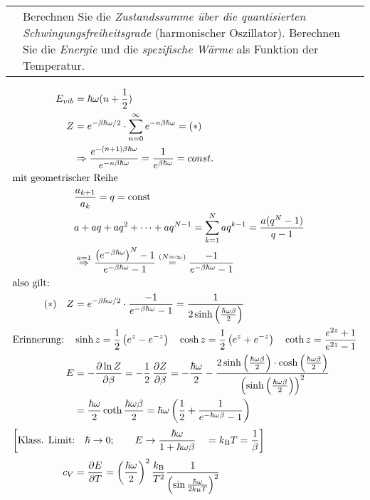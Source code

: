\documentclass[a4paper,12pt]{scrartcl}
\makeatletter
\def\dpf#1#2{\dfrac{\partial #1}{\partial #2}}		%
\def\ka#1{\left(#1\right)}				%
\def\const{\mathrm{const}}				%
\def\kB{k_\mathrm{B}}					%
\newcounter{qc}\setcounter{qc}{1}
\newenvironment{fshaded}{
\def\FrameCommand{\fcolorbox{framecolor}{shadecolor}}
\MakeFramed {\FrameRestore}}
{\endMakeFramed}
\def\frage#1{
\begin{fshaded}
\noindent
\begin{tabularx}{0.99\textwidth}{@{}c!{\color{framecolor}\vline}X}
{ \bf \rm \theqc }	&	\noindent #1
\end{tabularx}
\stepcounter{qc}
\end{fshaded}
}
\makeatother
\begin{document}


\frage{Berechnen Sie die \textit{Zustandssumme über die quantisierten Schwingungsfreiheitsgrade} (harmonischer Oszillator). 
Berechnen Sie die \textit{Energie} und die \textit{spezifische Wärme} als Funktion der
Temperatur.}
\noindent
\begin{align*}
E_{vib}&=\hbar\omega(n+\frac{1}{2})\\
Z&=e^{-\beta \hbar \omega/2} \cdot \sum_{n=0}^{\infty}e^{-n \beta \hbar \omega}=(*)\\
&\Rightarrow \dfrac{e^{-(n+1)\beta \hbar \omega}}{e^{-n \beta \hbar \omega}} = \dfrac{1}{e^{\beta \hbar \omega}}=const.\\
\intertext{mit geometrischer Reihe}
&\dfrac{a_{k+1}}{a_k}=q=\const\\&a+aq+aq^2+ \cdots + aq^{N-1}=\sum_{k=1}^{N} 
aq^{k-1}=\dfrac{a(q^N-1)}{q-1}\\
&\stackrel{a=1}{\Rightarrow} \dfrac{ \left( e^{-\beta \hbar \omega} \right )^N-1}{e^{-\beta \hbar \omega}-1} 
\stackrel{(N=\infty)}{=} \dfrac{-1}{e^{-\beta \hbar \omega}-1}\\ %
\intertext{also gilt:}
(*)\quad Z&=e^{-\beta \hbar \omega/2} \cdot \dfrac{-1}{e^{-\beta \hbar \omega}-1}=\dfrac{1}{2 \sinh \left( \frac{\hbar \omega 
\beta}{2} \right)}\\
\text{Erinnerung:}\quad&\sinh z=\frac12\ka{e^z-e^{-z}}\quad\cosh z=\frac12\ka{e^z+e^{-z}}\quad\coth 
z=\frac{e^{2z}+1}{e^{2z}-1}\\
E&=-\dpf{\ln Z}{\beta}=-\dfrac{1}{2}\,\dpf{Z}{\beta}=-\dfrac{\hbar \omega}{2}-\dfrac{2 \sinh \left( \frac{\hbar \omega 
\beta}{2} \right) \cdot \cosh \left( \frac{\hbar \omega \beta}{2} \right)}{\left( \sinh \left( \frac{\hbar \omega \beta}{2} 
\right) \right)^2}\\
&=\dfrac{\hbar \omega}{2} \coth \dfrac{\hbar \omega \beta}{2}=\hbar \omega \left( \dfrac{1}{2}+\dfrac{1}{e^{-\hbar \omega 
\beta}-1} \right)\\
\intertext{$\left[ \text{Klass. Limit:} \quad \hbar \rightarrow 0; \qquad E \rightarrow \dfrac{\hbar \omega}{1+\hbar \omega 
\beta}\quad = \kB  T = \dfrac{1}{\beta} \right]$}
c_V&=\dpf{E}{T}=\left( \dfrac{\hbar \omega}{2} \right)^2 \dfrac{\kB }{T^2} \dfrac{1}{\left( \sin \frac{\hbar \omega}{2 \kB  T} 
\right)^2}
\end{align*}

\end{document}
